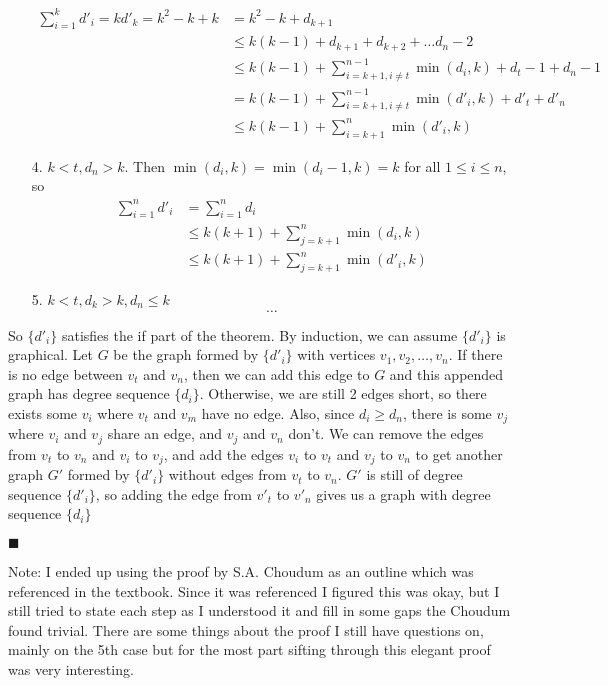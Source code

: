 \documentclass[12pt]{article}
\renewcommand{\qed}{\hfill$\blacksquare$}
\renewenvironment{proof}{\vspace{1em}\begin{addmargin}[2em]{0em}\begin{newproof}}{\end{newproof}\end{addmargin}\qed}
\begin{document}
\begin{proof}
\begin{itemize}
			\begin{align*}
				\sum_{i=1}^k d'_i = kd'_k = k^2 - k + k &= k^2 - k + d_{k+1} \\
									&\le k(k-1) + d_{k+1} + d_{k+2} + \ldots d_n - 2 \\
									&\le k(k-1) + \sum_{i=k+1,i\neq t}^{n-1} \min(d_i,k) + d_t - 1 + d_n - 1 \\
									&= k(k-1) + \sum_{i=k+1,i\neq t}^{n-1} \min(d'_i,k) + d'_t + d'_n \\
									&\le k(k-1) + \sum_{i=k+1}^n \min(d'_i,k)
			\end{align*}
		\item[4.] $k < t,d_n > k$. Then $\min(d_i,k) = \min(d_i-1,k) = k$ for all $1 \le i \le n$, so
			\begin{align*}
				\sum_{i=1}^n d'_i &= \sum_{i=1}^n d_i \\
						  &\le k(k+1) + \sum_{j=k+1}^n \min(d_i,k) \\
						  &\le k(k+1) + \sum_{j=k+1}^n \min(d'_i,k)
			\end{align*}
		\item[5.] $k < t,d_k > k, d_n \le k$
			\[
				\ldots
			\]
	\end{itemize}
	So $\{d'_i\}$ satisfies the if part of the theorem. By induction, we can assume $\{d'_i\}$ is graphical. Let $G$ be the graph formed by $\{d'_i\}$ with vertices $v_1,v_2,\ldots,v_n$. If there is no edge between $v_t$ and $v_n$, then we can add this edge to $G$ and this appended graph has degree sequence $\{d_i\}$. Otherwise, we are still 2 edges short, so there exists some $v_i$ where $v_t$ and $v_m$ have no edge. Also, since $d_i \ge d_n$, there is some $v_j$ where $v_i$ and $v_j$ share an edge, and $v_j$ and $v_n$ don't. We can remove the edges from $v_t$ to $v_n$ and $v_i$ to $v_j$, and add the edges $v_i$ to $v_t$ and $v_j$ to $v_n$ to get another graph $G'$ formed by $\{d'_i\}$ without edges from $v_t$ to $v_n$. $G'$ is still of degree sequence $\{d'_i\}$, so adding the edge from $v'_t$ to $v'_n$ gives us a graph with degree sequence $\{d_i\}$
	
\end{proof}

Note: I ended up using the proof by S.A. Choudum as an outline which was referenced in the textbook. Since it was referenced I figured this was okay, but I still tried to state each step as I understood it and fill in some gaps the Choudum found trivial. There are some things about the proof I still have questions on, mainly on the 5th case but for the most part sifting through this elegant proof was very interesting.
\end{document}
